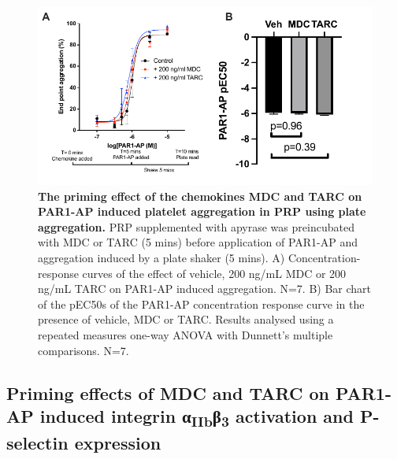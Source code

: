 \documentclass[11pt,twoside]{bristolthesis}
\begin{document}
\begin{figure}
\includegraphics{figure/Chemokines/Layouts/MDC_TARC_PRP_plate_agg} \caption[The priming effect of the chemokines MDC and TARC on PAR1-AP induced platelet aggregation in PRP using plate aggregation]{\textbf{The priming effect of the chemokines MDC and TARC on PAR1-AP induced platelet aggregation in PRP using plate aggregation.} PRP supplemented with apyrase was preincubated with MDC or TARC (5 mins) before application of PAR1-AP and aggregation induced by a plate shaker (5 mins). A) Concentration-response curves of the effect of vehicle, 200 ng/mL MDC or 200 ng/mL TARC on PAR1-AP induced aggregation. N=7. B) Bar chart of the pEC50s of the PAR1-AP concentration response curve in the presence of vehicle, MDC or TARC. Results analysed using a repeated measures one-way ANOVA with Dunnett's multiple comparisons. N=7.}\label{fig:MDC-TARC-agg-PRP}
\end{figure}
\hypertarget{priming-effects-of-mdc-and-tarc-on-par1-ap-induced-integrin-ux3b1iibux3b23-activation-and-p-selectin-expression}{%
\subsection{\texorpdfstring{Priming effects of MDC and TARC on PAR1-AP induced integrin α\textsubscript{IIb}β\textsubscript{3} activation and P-selectin expression}{Priming effects of MDC and TARC on PAR1-AP induced integrin αIIbβ3 activation and P-selectin expression}}\label{priming-effects-of-mdc-and-tarc-on-par1-ap-induced-integrin-ux3b1iibux3b23-activation-and-p-selectin-expression}}
\end{document}
